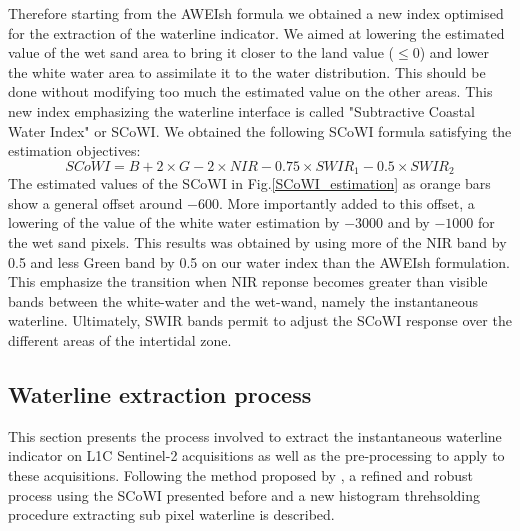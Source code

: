 \documentclass[remotesensing,article,submit,pdftex,moreauthors]{Definitions/mdpi}
\begin{document}
Therefore starting from the AWEIsh formula we obtained a new index optimised for the extraction of the waterline indicator. 
We aimed at lowering the estimated value of the wet sand area to bring it closer to the land value ($\le 0$) and lower the white water area to assimilate it to the water distribution.
This should be done without modifying too much the estimated value on the other areas.
This new index emphasizing the waterline interface is called "Subtractive Coastal Water Index" or SCoWI.
We obtained the following SCoWI formula satisfying the estimation objectives:
\begin{equation}
    SCoWI = B + 2 \times G - 2 \times NIR - 0.75 \times SWIR_1 - 0.5 \times SWIR_2
\end{equation}
The estimated values of the SCoWI in Fig.\ref{SCoWI_estimation} as orange bars show a general offset around $-600$. 
More importantly added to this offset, a lowering of the value of the white water estimation by $-3000$ and by $-1000$ for the wet sand pixels.
This results was obtained by using more of the NIR band by 0.5 and less Green band by 0.5 on our water index than the AWEIsh formulation.
This emphasize the transition when NIR reponse becomes greater than visible bands between the white-water and the wet-wand, namely the instantaneous waterline.
Ultimately, SWIR bands permit to adjust the SCoWI response over the different areas of the intertidal zone.
        
\subsection{Waterline extraction process}\label{extract_process}
This section presents the process involved to extract the instantaneous waterline indicator on L1C Sentinel-2 acquisitions as well as the pre-processing to apply to these acquisitions.
Following the method proposed by \citep{Bishop_sub_pixel}, a refined and robust process using the SCoWI presented before and a new histogram threhsolding procedure extracting sub pixel waterline is described.
\end{document}
